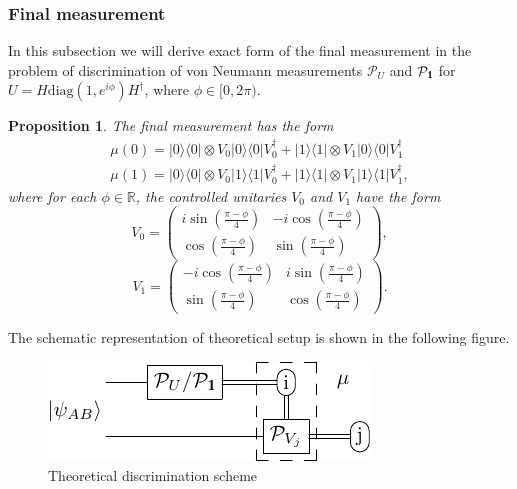 \documentclass[preprint,12pt, a4paper]{elsarticle}
\newcommand{\ket}[1]{\ensuremath{|#1\rangle}}
\newcommand{\bra}[1]{\ensuremath{\langle#1|}}
\newcommand{\ketbra}[2]{\ensuremath{\ket{#1}\bra{#2}}}
\newcommand{\proj}[1]{\ensuremath{\ketbra{#1}{#1}}}
\newcommand{\1}{{\rm 1\hspace{-0.9mm}l}}
\newcommand{\Id}{{\rm 1\hspace{-0.9mm}l}}
\newcommand{\PP}{\mathcal{P}}
\newcommand{\diag}{\mathrm{diag}}
\newtheorem{proposition}{Proposition}
\begin{document}
\subsubsection{Final measurement}\label{sec_example_final_measurement}
In this subsection we will derive exact form of the final measurement in the
problem of discrimination of von Neumann measurements $\PP_U$ and $\PP_{\Id}$
for $U = H \diag(1, e^{i \phi}) H^\dagger$, where $\phi \in [0, 2\pi)$.


\begin{proposition}
The  final measurement has the form
\begin{equation}
\begin{split}
\mu(0) = \proj{0} \otimes V_0 \proj{0} V_0^\dagger +  \proj{1} \otimes V_1 
\proj{0} V_1^\dagger  \\ 
\mu(1) = \proj{0} \otimes V_0 \proj{1} V_0^\dagger +  \proj{1} \otimes V_1 
\proj{1} V_1^\dagger,
\end{split}
\end{equation}
where for each $\phi \in \mathbb{R}$,  the controlled unitaries $V_0$ and $V_1$ 
have the form
\begin{equation}
V_0 = \left(\begin{array}{cc}i \sin\left( \frac{\pi - \phi}{4} \right)&-i 
\cos\left( \frac{\pi - \phi}{4} \right)\\ \cos\left( \frac{\pi - 
\phi}{4}\right)& \sin\left( \frac{\pi - \phi}{4} \right)\end{array}\right),
\end{equation}
\begin{equation}
V_1 = \left(\begin{array}{cc}-i \cos\left(\frac{\pi - \phi}{4}\right) &i 
\sin\left( \frac{\pi - \phi}{4}\right)\\\sin\left( \frac{\pi - \phi}{4} \right) 
&  \cos\left( \frac{\pi - \phi}{4} \right) \end{array}\right).
\end{equation}
\end{proposition}

The schematic representation of theoretical setup is shown in the following 
figure. 

\begin{figure}[h!]
\centering
\includegraphics[scale=1.2]{pics/theoretical_scheme}
\caption{Theoretical discrimination scheme}
\label{fig:theoretical_scheme}
\end{figure}
\end{document}
